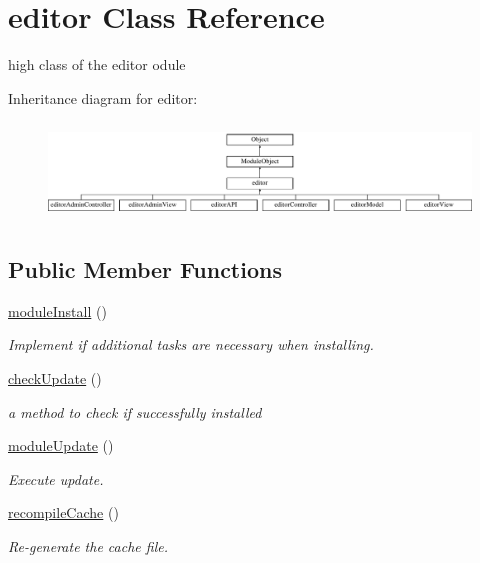 \hypertarget{classeditor}{}\section{editor Class Reference}
\label{classeditor}


high class of the editor odule  


Inheritance diagram for editor\+:\begin{figure}[H]
\begin{center}
\leavevmode
\includegraphics[height=2.610723cm]{classeditor}
\end{center}
\end{figure}
\subsection*{Public Member Functions}
\begin{DoxyCompactItemize}
\item 
\hyperlink{classeditor_a4429a1458f38d5005fb611f552ae00e7}{module\+Install} ()
\begin{DoxyCompactList}\small\item\em Implement if additional tasks are necessary when installing. \end{DoxyCompactList}\item 
\hyperlink{classeditor_a1247f9114d6c06b321de3b360920364b}{check\+Update} ()
\begin{DoxyCompactList}\small\item\em a method to check if successfully installed \end{DoxyCompactList}\item 
\hyperlink{classeditor_a34fed67c964b594c9f30d52c3da5978c}{module\+Update} ()
\begin{DoxyCompactList}\small\item\em Execute update. \end{DoxyCompactList}\item 
\hyperlink{classeditor_a0d96c544cee01a5c733a7c0b7def14e2}{recompile\+Cache} ()
\begin{DoxyCompactList}\small\item\em Re-\/generate the cache file. \end{DoxyCompactList}\end{DoxyCompactItemize}
